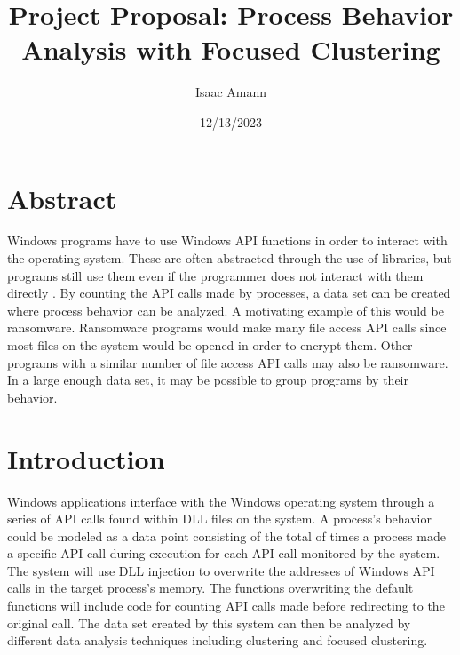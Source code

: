 \documentclass[titlepage]{article}
\title{Project Proposal: Process Behavior Analysis with Focused Clustering}
\author{Isaac Amann}
\date {12/13/2023}
\begin{document}
\maketitle
\tableofcontents

\section{Abstract}
\begin{flushleft}
    Windows programs have to use Windows API functions in order to interact with the operating system. These are often abstracted through the use of libraries, but programs still use them even if the programmer does not interact with them directly \cite{winAPI}. By counting the API calls made by processes, a data set can be created where process behavior can be analyzed. A motivating example of this would be ransomware. Ransomware programs would make many file access API calls since most files on the system would be opened in order to encrypt them. Other programs with a similar number of file access API calls may also be ransomware. In a large enough data set, it may be possible to group programs by their behavior.
\end{flushleft}

\section{Introduction}
\begin{flushleft}
Windows applications interface with the Windows operating system through a series of API calls found within DLL files on the system. A process's behavior could be modeled as a data point consisting of the total of times a process made a specific API call during execution for each API call monitored by the system. The system will use DLL injection to overwrite the addresses of Windows API calls in the target process's memory. The functions overwriting the default functions will include code for counting API calls made before redirecting to the original call. The data set created by this system can then be analyzed by different data analysis techniques including clustering and focused clustering. 
\end{flushleft}
\end{document}
